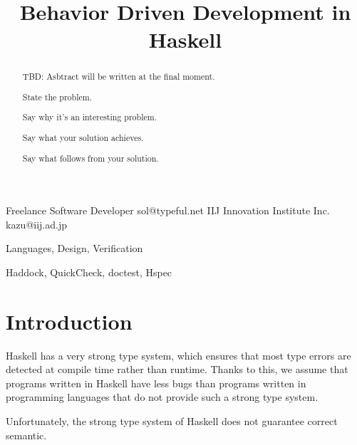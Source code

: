\documentclass[preprint]{sigplanconf}
\begin{document}
\copyrightdata{[to be supplied]}


\title{Behavior Driven Development in Haskell}

           {Freelance Software Developer}
           {sol@typeful.net}
           {IIJ Innovation Institute Inc.}
           {kazu@iij.ad.jp}

\maketitle

\begin{abstract}

TBD: Asbtract will be written at the final moment.

State the problem.

Say why it’s an interesting problem.

Say what your solution achieves.

Say what follows from your solution.

\end{abstract}


\terms Languages, Design, Verification

\keywords Haddock, QuickCheck, doctest, Hspec

\section{Introduction}


Haskell has a very strong type system, which ensures that most type errors are
detected at compile time rather than runtime.  Thanks to this, we assume that
programs written in Haskell have less bugs than programs written in programming
languages that do not provide such a strong type system.

Unfortunately, the strong type system of Haskell does not guarantee correct
semantic.
\end{document}

